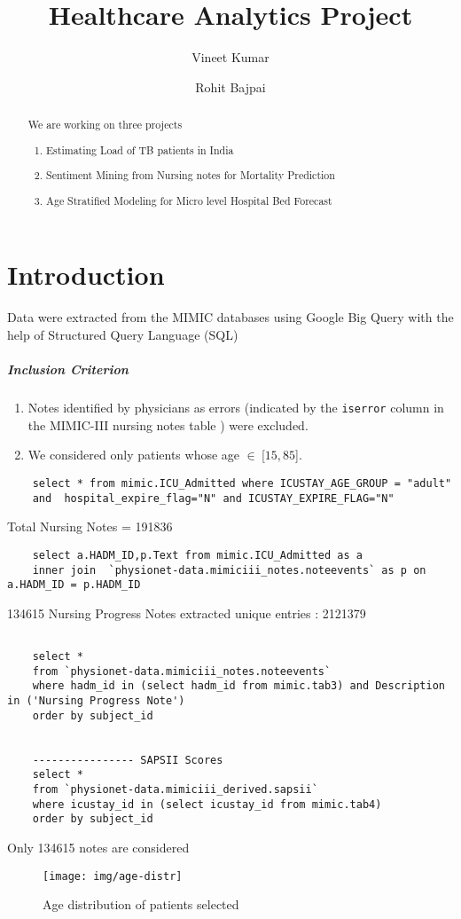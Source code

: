 \documentclass[10pt,a4paper]{report}
\title{Healthcare Analytics Project}
\author{Vineet Kumar \and Rohit Bajpai}
\begin{document}
	\maketitle
	\begin{abstract}
		We are working on three projects
		\begin{enumerate}
			\item Estimating Load of TB patients in India
			\item Sentiment Mining from Nursing notes for Mortality Prediction
			\item Age Stratified Modeling for Micro level Hospital Bed Forecast
		\end{enumerate}
	\end{abstract}
	\tableofcontents
	\chapter{Introduction}
	
	Data were extracted from the MIMIC databases using
	Google Big Query with the help of Structured Query Language (SQL)
	
	\paragraph{Inclusion Criterion}
	\begin{enumerate}
		\item Notes identified by physicians as errors (indicated by the \texttt{iserror} column in the MIMIC-III
		nursing notes table ) were excluded.
		\item We considered only patients whose age $\in ~ $[$15,85 $].
	\end{enumerate}

	\begin{verbatim}
	select * from mimic.ICU_Admitted where ICUSTAY_AGE_GROUP = "adult" 
	and  hospital_expire_flag="N" and ICUSTAY_EXPIRE_FLAG="N"
	\end{verbatim}
	
	Total Nursing Notes = 191836
	
	\begin{verbatim}
	select a.HADM_ID,p.Text from mimic.ICU_Admitted as a
	inner join  `physionet-data.mimiciii_notes.noteevents` as p on a.HADM_ID = p.HADM_ID
	\end{verbatim}
	134615 Nursing Progress Notes extracted
	unique entries : 2121379
	
	\begin{verbatim}
	
	select * 
	from `physionet-data.mimiciii_notes.noteevents` 
	where hadm_id in (select hadm_id from mimic.tab3) and Description in ('Nursing Progress Note')
	order by subject_id
	
	
	---------------- SAPSII Scores
	select * 
	from `physionet-data.mimiciii_derived.sapsii` 
	where icustay_id in (select icustay_id from mimic.tab4)
	order by subject_id
	\end{verbatim}
	
	Only 134615 notes are considered
	\begin{figure}[h!]
		\centering
		\texttt{[image: img/age-distr]}
		\caption{Age distribution of patients selected}
		\label{fig:age-distr}
	\end{figure}
	
\end{document}
